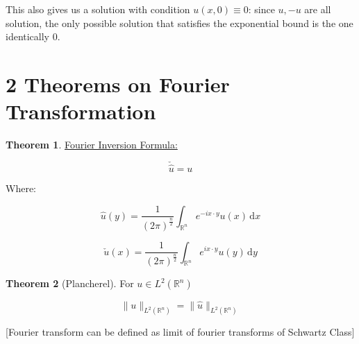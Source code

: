 \documentclass{article}
\theoremstyle{definition}
\newtheorem{theorem}{Theorem}
\begin{document}
This also gives us a solution with condition \(u(x,0)\equiv 0\): since \(u,-u\) are all solution, the only possible solution that satisfies the exponential bound is the one identically 0.

\section*{2 Theorems on Fourier Transformation}

\begin{theorem}
    \underline{Fourier Inversion Formula:}

    \[
        \check{\hat{u}} = u
    \]

    Where:

    \[
        \hat{u}(y) = \frac{1}{(2\pi)^\frac{n}{2}}\int_{\mathbb{R}^n}^{} e^{-ix\cdot y}u(x) \,\mathrm{d}x 
    \]

    \[
        \check{u}(x) = \frac{1}{(2\pi)^\frac{n}{2}}\int_{\mathbb{R}^n}^{} e^{ix\cdot y}u(y) \,\mathrm{d}y 
    \]
\end{theorem}

\begin{theorem}
    [Plancherel]

    For \(u\in L^2(\mathbb{R}^n)\) 

    \[
        \lVert u \rVert _{L^2(\mathbb{R}^n)} = \lVert \hat{u} \rVert _{L^2(\mathbb{R}^n)}
    \]

    [Fourier transform can be defined as limit of fourier transforms of Schwartz Class]

\end{theorem}
\end{document}
